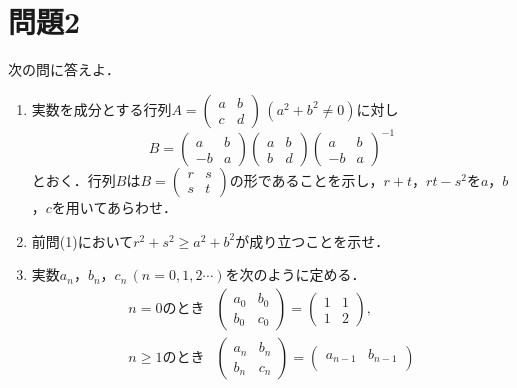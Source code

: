 \documentclass[unicode,12pt, A4j]{ltjsarticle}%
\begin{document}
\section{問題2}
次の問に答えよ．
\begin{enumerate}
 \item 実数を成分とする行列$A=\begin{pmatrix}
			       a & b \\ c & d 
			      \end{pmatrix}\, (a^2+b^2\neq 0)$に対し
       \begin{equation}
	B=\begin{pmatrix}
	   a & b \\
	   -b & a 
	  \end{pmatrix}
	\begin{pmatrix}
	   a & b \\
	   b & d 
	  \end{pmatrix}
	\begin{pmatrix}
	   a & b \\
	   -b & a 
	  \end{pmatrix}^{-1}
       \end{equation}
       とおく．行列$B$は$B=\begin{pmatrix}
                                r & s \\ s & t
                               \end{pmatrix}$の形であることを示し，$r+t$，$rt-s^2$を$a$，$b$，$c$を用いてあらわせ．
 \item 前問(1)において$r^2+s^2\ge a^2+b^2$が成り立つことを示せ．
 \item 実数$a_n$，$b_n$，$c_n\, (n=0,1,2\cdots)$を次のように定める．
       \begin{align}
	\text{$n=0$のとき} & 
	\begin{pmatrix}
            a_0 & b_0 \\
            b_0 & c_0
	\end{pmatrix} =
	\begin{pmatrix}
             1 & 1 \\
             1 & 2
	\end{pmatrix}, \\
	\text{$n\ge 1$のとき} & 
	\begin{pmatrix}
            a_n & b_n \\
            b_n & c_n
	\end{pmatrix} =
	\begin{pmatrix}
             a_{n-1} & b_{n-1} \\

\end{pmatrix}
\end{align}
\end{enumerate}
\end{document}
